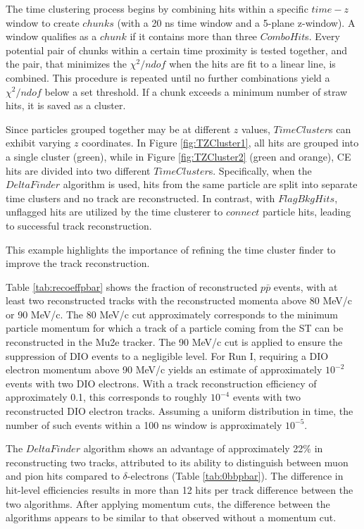 The time clustering process begins 
by combining hits within a specific $time-z$ 
window to create $chunks$ (with a 
20 ns time window and a 5-plane z-window). 
A window qualifies as a $chunk$ if 
it contains more than three $ComboHit$s. 
Every potential pair of chunks 
within a certain time 
proximity is tested together, 
and the pair, that minimizes 
the $\chi^2/ndof$ when the hits 
are fit to a linear line, 
is combined. This procedure is 
repeated until no further combinations 
yield a $\chi^2/ndof$ below a set 
threshold. If a chunk 
exceeds a minimum number of straw 
hits, it is saved as a cluster.

Since particles grouped together 
may be at different $z$ values, 
$TimeCluster$s can exhibit varying 
$z$ coordinates. In Figure \ref{fig:TZCluster1}, 
all hits are grouped into a single cluster (green), 
while in Figure \ref{fig:TZCluster2} 
(green and orange), CE hits are divided into 
two different $TimeCluster$s.  
Specifically, when the $DeltaFinder$ algorithm is used,
hits from the same 
particle are split into separate time clusters and no 
track are reconstructed. In contrast, 
with $FlagBkgHits$, unflagged hits are utilized by the 
time clusterer to $connect$ particle hits, 
leading to successful track reconstruction. 

This example highlights the importance of refining 
the time cluster finder to improve the track reconstruction.


Table \ref{tab:recoeffpbar} shows the fraction of reconstructed $p\bar{p}$ events, 
with at least two reconstructed tracks with the reconstructed momenta above 80 MeV/c or 90 MeV/c. The 80 
MeV/c cut approximately corresponds to the minimum particle momentum for which 
a track of a particle coming from the ST can be reconstructed 
in the Mu2e tracker. The 90 MeV/c cut is applied to ensure the 
suppression of DIO events to a negligible level. 
For Run I, requiring a DIO electron momentum above 90 MeV/c 
yields an estimate of approximately $10^{-2}$ events with 
two DIO electrons. With a track reconstruction efficiency of 
approximately 0.1, this corresponds to roughly $10^{-4}$ events with two 
reconstructed DIO electron tracks.
Assuming a uniform distribution in time, the number of such events
within a 100 ns window is approximately $10^{-5}$.

The $DeltaFinder$ algorithm shows an advantage of 
approximately 22\% in reconstructing 
two tracks, attributed to its ability to distinguish between 
muon and pion hits compared to $\delta$-electrons (Table \ref{tab:0bbpbar}). 
The difference in hit-level efficiencies results in more 
than 12 hits per track difference between the two algorithms. After 
applying momentum cuts, the difference between the algorithms 
appears to be similar to that observed without a momentum cut.


